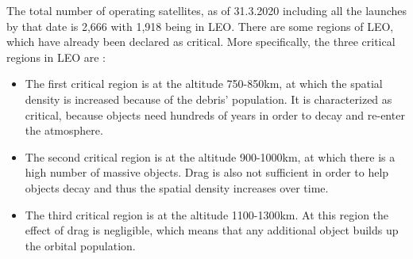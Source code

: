 The total number of operating satellites, as of 31.3.2020 including all the launches by that date is 2,666 with 1,918 being in LEO. \cite{UCS} There are some regions of LEO, which have already been declared as critical. More specifically, the three critical regions in LEO are \cite{Kramer 2002}:
\begin{itemize}
\item The first critical region is at the altitude 750-850km, at which the spatial density is increased because of the debris' population. It is characterized as critical, because objects need hundreds of years in order to decay and re-enter the atmosphere.
\item The second critical region is at the altitude 900-1000km, at which there is a high number of massive objects. Drag is also not sufficient in order to help objects decay and thus the spatial density increases over time.
\item The third critical region is at the altitude 1100-1300km. At this region the effect of drag is negligible, which means that any additional object builds up the orbital population.
\end{itemize}


%

